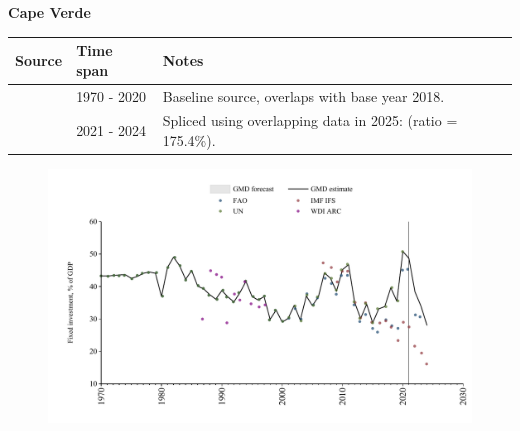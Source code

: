 \documentclass[12pt,a4paper,landscape]{article}
\begin{document}
\begin{adjustbox}{max totalsize={\paperwidth}{\paperheight},center}
\begin{minipage}[t][\textheight][t]{\textwidth}
\vspace*{0.5cm}
{}
\begin{center}
{\Large\bfseries Cape Verde}
\end{center}
\vspace{0.5cm}
\begin{table}[H]
\centering
\small
\begin{tabular}{|l|l|l|}
\hline
\textbf{Source} & \textbf{Time span} & \textbf{Notes} \\
\hline
\rowcolor{white}\cite{UN}& 1970 - 2020 &Baseline source, overlaps with base year 2018.\\
\rowcolor{lightgray}\cite{IMF_IFS}& 2021 - 2024 &Spliced using overlapping data in 2025: (ratio = 175.4\%).\\
\hline
\end{tabular}
\end{table}
\begin{figure}[H]
\centering
\includegraphics[width=\textwidth,height=0.6\textheight,keepaspectratio]{graphs/CPV_finv_GDP.pdf}
\end{figure}
\end{minipage}
\end{adjustbox}
\end{document}
